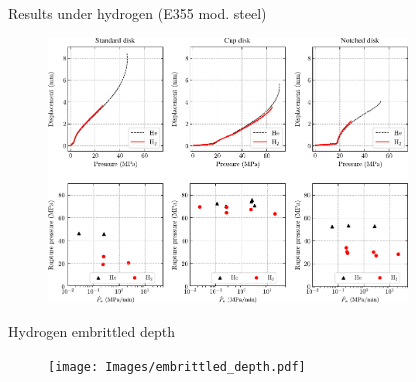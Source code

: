 \documentclass[9pt]{beamer}
\begin{document}
\begin{frame}{Results under hydrogen (E355 mod. steel)}

\begin{figure}
	\centering
	\includegraphics[width=0.85\textwidth]{Images/H2_results_E355.pdf} \\
\end{figure}

\end{frame}


\begin{frame}{Hydrogen embrittled depth}

\begin{figure}
	\centering
	\texttt{[image: Images/embrittled\_depth.pdf]} \\
\end{figure}

\end{frame}

\end{document}
